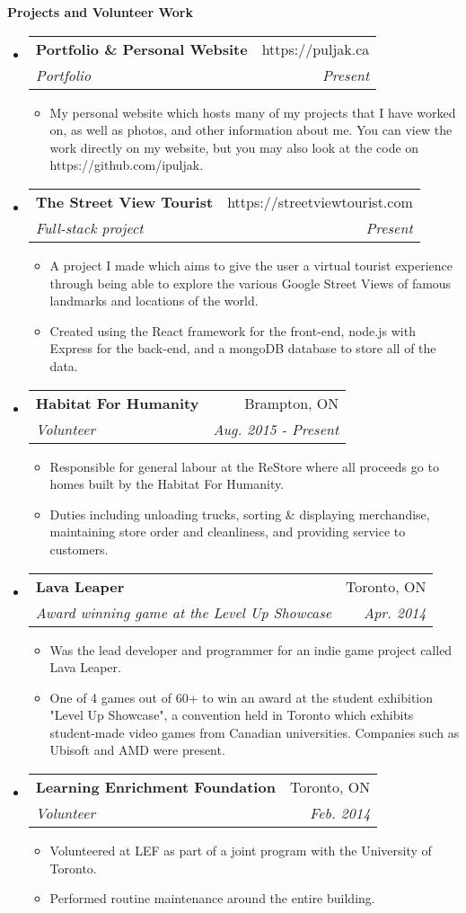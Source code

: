\documentclass[letterpaper,11pt]{article}
\makeatletter
\newcommand{\resitem}[1]{\item #1 \vspace{-2pt}}
\newcommand{\ressubheading}[4]{
\begin{tabular*}{6.5in}{l@{\extracolsep{\fill}}r}
		\textbf{#1} & #2 \\
		\textit{#3} & \textit{#4} \\
\end{tabular*}\vspace{-6pt}}
\makeatother
\begin{document}
\begin{mdframed}[backgroundcolor=light-gray]
\textbf{Projects and Volunteer Work}
\end{mdframed}
\begin{itemize}
\item
	\ressubheading{Portfolio \& Personal Website}{https://puljak.ca}{Portfolio}{Present}
	\begin{itemize}
		\resitem{My personal website which hosts many of my projects that I have worked on, as well as photos, and other information about me. You can view the work directly on my website, but you may also look at the code on https://github.com/ipuljak.}
	\end{itemize}
\item
	\ressubheading{The Street View Tourist}{https://streetviewtourist.com}{Full-stack project}{Present}
	\begin{itemize}
		\resitem{A project I made which aims to give the user a virtual tourist experience through being able to explore the various Google Street Views of famous landmarks and locations of the world.}
		\resitem{Created using the React framework for the front-end, node.js with Express for the back-end, and a mongoDB database to store all of the data.}
	\end{itemize}
\item
	\ressubheading{Habitat For Humanity}{Brampton, ON}{Volunteer}{Aug. 2015 - Present}
	\begin{itemize}
		\resitem{Responsible for general labour at the ReStore where all proceeds go to homes built by the Habitat For Humanity.}
		\resitem{Duties including unloading trucks, sorting \& displaying merchandise, maintaining store order and cleanliness, and providing service to customers.}
	\end{itemize}
\item
	\ressubheading{Lava Leaper}{Toronto, ON}{Award winning game at the Level Up Showcase}{Apr. 2014}
	\begin{itemize}
		\resitem{Was the lead developer and programmer for an indie game project called Lava Leaper.}
		\resitem{One of 4 games out of 60+ to win an award at the student exhibition "Level Up Showcase", a convention held in Toronto which exhibits student-made video games from 	Canadian universities. Companies such as Ubisoft and AMD were present.}
	\end{itemize}
\item
	\ressubheading{Learning Enrichment Foundation}{Toronto, ON}{Volunteer}{Feb. 2014}
	\begin{itemize}
		\resitem{Volunteered at LEF as part of a joint program with the University of Toronto.}
		\resitem{Performed routine maintenance around the entire building.}
	\end{itemize}

\end{itemize}
\end{document}
